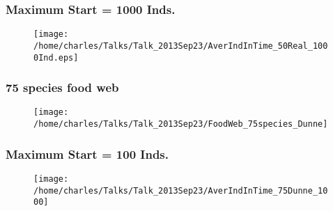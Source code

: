 \documentclass[xcolor=x11names,compress]{beamer}
\renewcommand{\(}{\begin{columns}}
\renewcommand{\)}{\end{columns}}
\newcommand{\<}[1]{\begin{column}{#1}}
\renewcommand{\>}{\end{column}}
\begin{document}

\begin{frame}
\frametitle{Maximum Start = 1000 Inds.}
\begin{figure}
\texttt{[image: /home/charles/Talks/Talk\_2013Sep23/AverIndInTime\_50Real\_1000Ind.eps]}
\end{figure}
\end{frame}

%
%

\begin{frame}
\frametitle{75 species food web}
\begin{figure}
\texttt{[image: /home/charles/Talks/Talk\_2013Sep23/FoodWeb\_75species\_Dunne]}
\end{figure}
\end{frame}

\begin{frame}
\frametitle{Maximum Start = 100 Inds.}
\begin{figure}
\texttt{[image: /home/charles/Talks/Talk\_2013Sep23/AverIndInTime\_75Dunne\_1000]}
\end{figure}
\end{frame}
\end{document}
